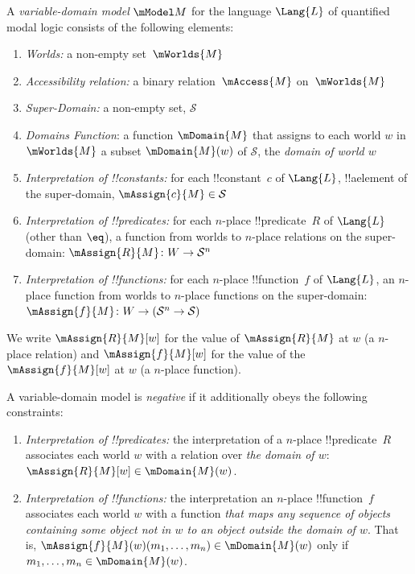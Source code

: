 \documentclass[../../../../include/open-logic-section]{subfiles}
\begin{document}
\begin{defn}
    A \emph{variable-domain model} $\mModel M$ for the language $\Lang{L}$ 
    of quantified modal logic consists of the following elements:
    \begin{enumerate}
    \item \emph{Worlds:} a non-empty set~$\mWorlds{M}$
    \item \emph{Accessibility relation:} a binary relation~$\mAccess{M}$ on~$\mWorlds{M}$
    \item \emph{Super-Domain:} a non-empty set, $\mathcal{S}$
    \item \emph{Domains Function}: a function $\mDomain{M}$ that assigns
    to each world $w$ in $\mWorlds{M}$ a subset $\mDomain{M}(w)$ of $\mathcal{S}$, the \emph{domain of world $w$}
\item \emph{Interpretation of !!{constant}s:} for each !!{constant}~$c$ of
  $\Lang{L}$, !!a{element} of the super-domain, $\mAssign{c}{M} \in \mathcal{S}$
\item \emph{Interpretation of !!{predicate}s:} for each $n$-place
  !!{predicate}~$R$ of $\Lang{L}$ (other than $\eq$), a function 
  from worlds to $n$-place
  relations on the super-domain: $\mAssign{R}{M} \colon W \to \mathcal{S}^n$
\item \emph{Interpretation of !!{function}s:} for each $n$-place
  !!{function}~$f$ of $\Lang{L}$, an $n$-place function from worlds 
  to $n$-place functions on the super-domain: $\mAssign{f}{M} \colon W \to 
  (\mathcal{S}^n \to \mathcal{S})$

\end{enumerate}

We write $\mAssign{R}{M}[w]$ for the value of $\mAssign{R}{M}$ at $w$ (a $n$-place relation) and $\mAssign{f}{M}[w]$ for the value of the 
$\mAssign{f}{M}[w]$ at $w$ (a $n$-place function). 
\end{defn}

\begin{defn}
  A variable-domain model is \emph{negative} if it additionally 
  obeys the following constraints:
  \begin{enumerate}
    \item \emph{Interpretation of !!{predicate}s:} the interpretation
    of a $n$-place !!{predicate}~$R$ associates each world $w$ with a
    relation over \emph{the domain of $w$}: $\mAssign{R}{M}[w]\in
    \mDomain{M}(w)$. 
  \item \emph{Interpretation of !!{function}s:} the interpretation 
    an $n$-place !!{function}~$f$ associates each world $w$ with a 
    function \emph{that maps any sequence of objects
    containing some object not in $w$ to an object outside the domain 
    of $w$}. That is, $\mAssign{f}{M}(w)(m_1,\ldots,m_n)\in \mDomain{M}(w)$
    only if $m_1,\ldots,m_n\in \mDomain{M}(w)$.
  \end{enumerate}
\end{defn}
\end{document}
